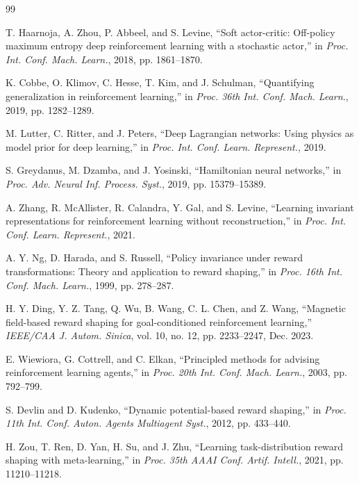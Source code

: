 \documentclass[journal]{IEEEtran}
\begin{document}
	\begin{thebibliography}{99}
		
		T. Haarnoja, A. Zhou, P. Abbeel, and S. Levine, ``Soft actor-critic: Off-policy maximum entropy deep reinforcement learning with a stochastic actor,'' in \textit{Proc. Int. Conf. Mach. Learn.}, 2018, pp. 1861--1870.
		
		K. Cobbe, O. Klimov, C. Hesse, T. Kim, and J. Schulman, ``Quantifying generalization in reinforcement learning,'' in \textit{Proc. 36th Int. Conf. Mach. Learn.}, 2019, pp. 1282--1289.
		
		M. Lutter, C. Ritter, and J. Peters, ``Deep Lagrangian networks: Using physics as model prior for deep learning,'' in \textit{Proc. Int. Conf. Learn. Represent.}, 2019.
		
		S. Greydanus, M. Dzamba, and J. Yosinski, ``Hamiltonian neural networks,'' in \textit{Proc. Adv. Neural Inf. Process. Syst.}, 2019, pp. 15379--15389.
		
		A. Zhang, R. McAllister, R. Calandra, Y. Gal, and S. Levine, ``Learning invariant representations for reinforcement learning without reconstruction,'' in \textit{Proc. Int. Conf. Learn. Represent.}, 2021.
		
		A. Y. Ng, D. Harada, and S. Russell, ``Policy invariance under reward transformations: Theory and application to reward shaping,'' in \textit{Proc. 16th Int. Conf. Mach. Learn.}, 1999, pp. 278--287.
		
		H. Y. Ding, Y. Z. Tang, Q. Wu, B. Wang, C. L. Chen, and Z. Wang, ``Magnetic field-based reward shaping for goal-conditioned reinforcement learning,'' \textit{IEEE/CAA J. Autom. Sinica}, vol. 10, no. 12, pp. 2233--2247, Dec. 2023.
		
		E. Wiewiora, G. Cottrell, and C. Elkan, ``Principled methods for advising reinforcement learning agents,'' in \textit{Proc. 20th Int. Conf. Mach. Learn.}, 2003, pp. 792--799.
		
		S. Devlin and D. Kudenko, ``Dynamic potential-based reward shaping,'' in \textit{Proc. 11th Int. Conf. Auton. Agents Multiagent Syst.}, 2012, pp. 433--440.
		
		H. Zou, T. Ren, D. Yan, H. Su, and J. Zhu, ``Learning task-distribution reward shaping with meta-learning,'' in \textit{Proc. 35th AAAI Conf. Artif. Intell.}, 2021, pp. 11210--11218.
		

\end{thebibliography}
\end{document}
